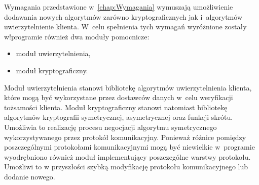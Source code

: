 
Wymagania przedstawione w~\ref{chap:Wymagania} wymuszają umożliwienie
dodawania nowych algorytmów zarówno kryptograficznych jak i~algorytmów
uwierzytelnienie klienta. W~celu spełnienia tych wymagań wyróżnione
zostały w!programie również dwa moduły pomocnicze:

\begin{itemize}
\item moduł uwierzytelnienia,
\item moduł kryptograficzny.
\end{itemize}

Moduł uwierzytelnienia stanowi bibliotekę algorytmów uwierzytelnienia
klienta, które mogą być wykorzystane przez dostawców danych w~celu
weryfikacji tożsamości klienta. Moduł kryptograficzny stanowi
natomiast bibliotekę algorytmów kryptografii symetrycznej,
asymetrycznej oraz funkcji skrótu. Umożliwia to realizację procesu
negocjacji algorytmu symetrycznego wykorzystywanego przez protokół
komunikacyjny. Ponieważ różnice pomiędzy poszczególnymi protokołami
komunikacyjnymi mogą być niewielkie w~programie wyodrębniono również
moduł implementujący poszczególne warstwy protokołu. Umożliwi to w
przyszłości szybką modyfikację protokołu komunikacyjnego lub dodanie
nowego.

